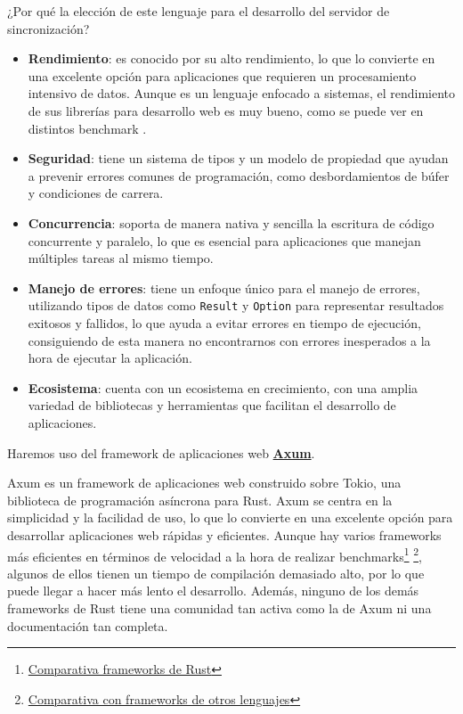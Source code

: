 ¿Por qué la elección de este lenguaje para el desarrollo del servidor de sincronización?
\begin{itemize}
    \item \textbf{Rendimiento}: es conocido por su alto rendimiento, lo que lo convierte en una excelente opción para aplicaciones que requieren un procesamiento intensivo de datos. Aunque es un lenguaje enfocado a sistemas, el rendimiento de sus librerías para desarrollo web es muy bueno, como se puede ver en distintos benchmark \cite{rust-benchmark}.
    \item \textbf{Seguridad}: tiene un sistema de tipos y un modelo de propiedad que ayudan a prevenir errores comunes de programación, como desbordamientos de búfer y condiciones de carrera.
    \item \textbf{Concurrencia}: soporta de manera nativa y sencilla la escritura de código concurrente y paralelo, lo que es esencial para aplicaciones que manejan múltiples tareas al mismo tiempo.
    \item \textbf{Manejo de errores}: tiene un enfoque único para el manejo de errores, utilizando tipos de datos como \texttt{Result} y \texttt{Option} para representar resultados exitosos y fallidos, lo que ayuda a evitar errores en tiempo de ejecución, consiguiendo de esta manera no encontrarnos con errores inesperados a la hora de ejecutar la aplicación.
    \item \textbf{Ecosistema}: cuenta con un ecosistema en crecimiento, con una amplia variedad de bibliotecas y herramientas que facilitan el desarrollo de aplicaciones.
\end{itemize}

Haremos uso del framework de aplicaciones web \href{https://github.com/tokio-rs/axum?tab=readme-ov-file}{\textbf{Axum}}.

Axum es un framework de aplicaciones web construido sobre Tokio, una biblioteca de programación asíncrona para Rust. Axum se centra en la simplicidad y la facilidad de uso, lo que lo convierte en una excelente opción para desarrollar aplicaciones web rápidas y eficientes.
Aunque hay varios frameworks más eficientes en términos de velocidad a la hora de realizar benchmarks\footnote{\href{https://web-frameworks-benchmark.netlify.app/result?l=rust}{Comparativa frameworks de Rust}} \footnote{\href{https://www.techempower.com/benchmarks/\#section=data-r21&test=composite&hw=ph}{Comparativa con frameworks de otros lenguajes}}, algunos de ellos tienen un tiempo de compilación demasiado alto, por lo que puede llegar a hacer más lento el desarrollo.
Además, ninguno de los demás frameworks de Rust tiene una comunidad tan activa como la de Axum ni una documentación tan completa.

